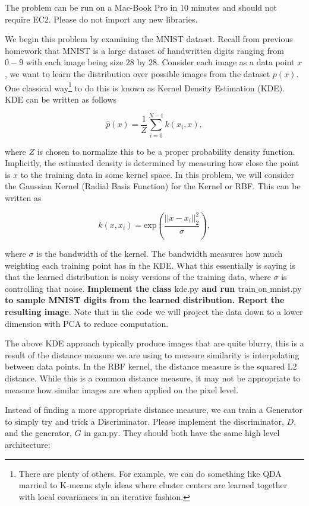 The problem can be run on a Mac-Book Pro in 10 minutes and should not require EC2. Please do not import any new libraries. 


\begin{Parts}
\Part We begin this problem by examining the MNIST dataset. Recall from previous homework that MNIST is a large dataset of handwritten digits ranging from $0-9$ with each image being size $28$ by $28$. Consider each image as a data point $x$, we want to learn the distribution over possible images from the dataset $p(x)$. One classical way\footnote{There are plenty of others. For example, we can do something like QDA married to K-means style ideas where cluster centers are learned together with local covariances in an iterative fashion.}  to do this is known as Kernel Density Estimation (KDE). KDE can be written as follows

$$\hat{p}(x) = \frac{1}{Z} \sum_{i=0}^{N-1} k(x_i,x),$$

where $Z$ is chosen to normalize this to be a proper probability density function. Implicitly, the estimated density is determined by measuring how close the point is $x$ to the training data in some kernel space. In this problem, we will consider the Gaussian Kernel (Radial Basis Function) for the Kernel or RBF. This can be written as 

$$k(x,x_i) = \mbox{exp}(\frac{||x-x_i||^2_2}{\sigma}),$$

where $\sigma$ is the bandwidth of the kernel. The bandwidth measures how much weighting each training point has in the KDE. What this essentially is saying is that the learned distribution is noisy versions of the training data, where $\sigma$ is controlling that noise.  {\bf Implement the class $\mbox{kde.py}$ and run $\mbox{train\_on\_mnist.py}$ to sample MNIST digits from the learned distribution. Report the resulting image}. Note that in the code we will project the data down to a lower dimension with PCA to reduce computation. 




\Part The above KDE approach typically produce images that are quite blurry, this is a result of the distance measure we are using to measure similarity is interpolating between data points. In the RBF kernel, the distance measure is the squared L2 distance. While this is a common distance measure, it may not be appropriate to measure how similar images are when applied on the pixel level. 

Instead of finding a more appropriate distance measure, we can train a Generator to simply try and trick a Discriminator. Please implement the discriminator, $D$, and the generator, $G$ in $\mbox{gan.py}$. They should both have the same high level architecture: 


\end{Parts}
